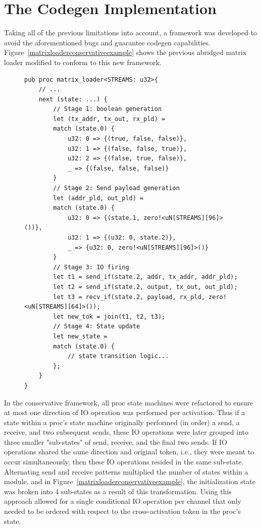 \section{The Codegen Implementation}
Taking all of the previous limitations into account, a framework was developed to avoid the aforementioned bugs and guarantee codegen capabilities. Figure~\ref{matrixloaderconservativeexample} shows the previous abridged matrix loader modified to conform to this new framework.

\begin{figure}[H]
\begin{lstlisting}[label={matrixloaderconservativeexample},caption={First codegen design of the matrix loader. The stages of a substate are indicated in comments.}, captionpos=b,style=mystyle]
pub proc matrix_loader<STREAMS: u32>{
    // ...
    next (state: ...) {
        // Stage 1: boolean generation
        let (tx_addr, tx_out, rx_pld) =
        match (state.0) {
            u32: 0 => {(true, false, false)},
            u32: 1 => {(false, false, true)},
            u32: 2 => {(false, true, false)},
            _ => {(false, false, false)}
        }
        // Stage 2: Send payload generation
        let (addr_pld, out_pld) =
        match (state.0) {
            u32: 0 => {(state.1, zero!<uN[STREAMS][96]>())},
            u32: 1 => {(u32: 0, state.2)},
            _ => {u32: 0, zero!<uN[STREAMS][96]>()}
        }
        // Stage 3: IO firing
        let t1 = send_if(state.2, addr, tx_addr, addr_pld);
        let t2 = send_if(state.2, output, tx_out, out_pld);
        let t3 = recv_if(state.2, payload, rx_pld, zero!<uN[STREAMS][64]>());
        let new_tok = join(t1, t2, t3);
        // Stage 4: State update
        let new_state =
        match (state.0) {
            // state transition logic...
        };
    }
}
\end{lstlisting}
\end{figure}


In the conservative framework, all proc state machines were refactored to ensure at most one direction of IO operation was performed per activation. Thus if a state within a proc's state machine originally performed (in order) a send, a receive, and two subsequent sends, these IO operations were later grouped into three smaller "sub-states" of send, receive, and the final two sends. If IO operations shared the same direction and original token, i.e., they were meant to occur simultaneously, then these IO operations resided in the same sub-state. Alternating send and receive patterns multiplied the number of states within a module, and in Figure~\ref{matrixloaderconservativeexample}, the initialization state was broken into 4 sub-states as a result of this transformation. Using this approach allowed for a single conditional IO operation per channel that only needed to be ordered with respect to the cross-activation token in the proc's state. 

